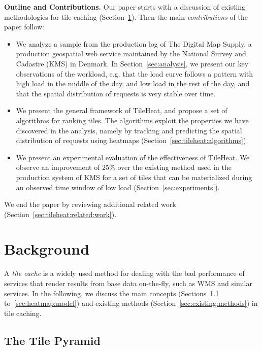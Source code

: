 \documentclass[11pt, oneside]{report}
\newcommand{\minisec}[1]{\noindent\textbf{#1.}}
\begin{document}
\minisec{Outline and Contributions}
Our paper starts with a discussion of existing methodologies for tile caching (Section~\ref{sec:tile:caching}). Then the main \emph{contributions} of the paper follow:
%
\begin{itemize}

\item We analyze a sample from the production log of The Digital Map Supply, a production geospatial web service maintained by the National Survey and Cadastre (KMS) in Denmark. In Section~\ref{sec:analysis}, we present our key observations of the workload, e.g. that the load curve follows a pattern with high load in the middle of the day, and low load in the rest of the day, and that the spatial distribution of requests is very stable over time.

\item We present the general framework of TileHeat, and propose a set of algorithms for ranking tiles. The algorithms exploit the properties we have discovered in the analysis, namely by tracking and predicting the spatial distribution of requests using heatmaps (Section~\ref{sec:tileheat:algorithms}).

\item We present an experimental evaluation of the effectiveness of TileHeat. We observe an improvement of $25\%$ over the existing method used in the production system of KMS  for a set of tiles that can be materialized during an observed time window of low load (Section~\ref{sec:experiments}).

\end{itemize}
%
We end the paper by reviewing additional related work (Section~\ref{sec:tileheat:related:work}). 


\section{Background}
\label{sec:tile:caching}

A \emph{tile cache} is a widely used method for dealing with the bad performance of services that render results from base data on-the-fly, such as WMS and similar services. In the following, we discuss the main concepts (Sections~\ref{sec:tile:pyramid} to~\ref{sec:heatmap:model}) and existing methods (Section~\ref{sec:existing:methods}) in tile caching.

\subsection{The Tile Pyramid}
\label{sec:tile:pyramid}
\end{document}
